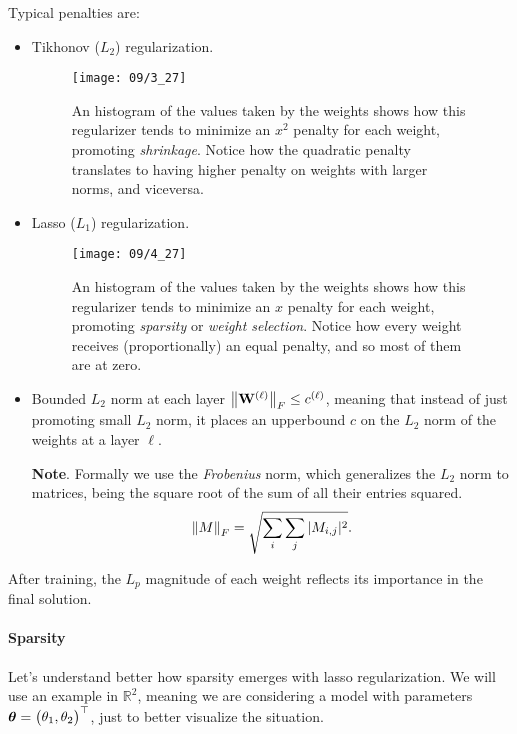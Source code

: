 Typical penalties are:
\begin{itemize}
    \item Tikhonov ($L_2$) regularization.
    \begin{figure}[H]
        \centering
        \texttt{[image: 09/3\_27]}
        \caption{An histogram of the values taken by the weights shows how this regularizer tends to minimize an $x^2$ penalty for each weight, promoting \emph{shrinkage}. Notice how the quadratic penalty translates to having higher penalty on weights with larger norms, and viceversa.}	
    \end{figure}

    \item Lasso ($L_1$) regularization.
    \begin{figure}[H]
        \centering
        \texttt{[image: 09/4\_27]}
        \caption{An histogram of the values taken by the weights shows how this regularizer tends to minimize an $x$ penalty for each weight, promoting \emph{sparsity} or \emph{weight selection}. Notice how every weight receives (proportionally) an equal penalty, and so most of them are at zero.}	
    \end{figure}

    \item Bounded $L_2$ norm at each layer $\norm{\mathbf{W}^{(\ell)}}_F \le c^{(\ell)}$, meaning that instead of just promoting small $L_2$ norm, it places an
    upperbound $c$ on the $L_2$ norm of the weights at a layer $\ell$. 
    
    \textbf{Note}. Formally we use the \emph{Frobenius} norm, which generalizes the $L_2$ norm to matrices, being the square root of the sum of all their entries squared.
    \begin{equation}
        \norm{M}_F = \sqrt{ \sum_i \sum_j |M_{i, j}|^2}.
    \end{equation}

\end{itemize}
After training, the $L_p$ magnitude of each weight reflects its importance in the final solution.\\


\paragraph{Sparsity}

Let's understand better how sparsity emerges with lasso regularization. We will use an example in $\mathbb{R}^2$, meaning we are considering a model with parameters $\vb*{\theta} = \mqty(\theta_1, \theta_2)^{\top}$, just to better visualize the situation. 

